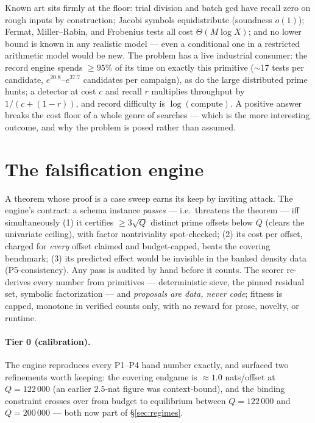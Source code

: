 Known art sits firmly at the floor: trial division and batch gcd have
recall zero on rough inputs by construction; Jacobi symbols
equidistribute (soundness $o(1)$); Fermat, Miller--Rabin, and Frobenius
tests all cost $\Theta(M\log X)$; and no lower bound is known in any
realistic model --- even a conditional one in a restricted arithmetic
model would be new. The problem has a live industrial consumer: the
record engine spends $\ge95\%$ of its time on exactly this primitive
($\sim$17 tests per candidate, $e^{20.8}$--$e^{37.7}$ candidates per
campaign), as do the large distributed prime hunts; a detector at cost
$c$ and recall $r$ multiplies throughput by $1/(c+(1-r))$, and record
difficulty is $\log(\text{compute})$. A positive answer breaks the cost
floor of a whole genre of searches --- which is the more interesting
outcome, and why the problem is posed rather than assumed.

\section{The falsification engine}\label{sec:engine7}

A theorem whose proof is a case sweep earns its keep by inviting
attack. The engine's contract: a schema instance \emph{passes} ---
i.e.\ threatens the theorem --- iff simultaneously (1) it certifies
$\ge3\sqrt Q$ distinct prime offsets below $Q$ (clears the univariate
ceiling), with factor nontriviality spot-checked; (2) its cost per
offset, charged for \emph{every} offset claimed and budget-capped,
beats the covering benchmark; (3) its predicted effect would be
invisible in the banked density data (P5-consistency). Any pass is
audited by hand before it counts. The scorer re-derives every number
from primitives --- deterministic sieve, the pinned residual set,
symbolic factorization --- and \emph{proposals are data, never code};
fitness is capped, monotone in verified counts only, with no reward for
prose, novelty, or runtime.

\paragraph{Tier 0 (calibration).} The engine reproduces every P1--P4
hand number exactly, and surfaced two refinements worth keeping: the
covering endgame is $\approx1.0$ nats/offset at $Q=122\,000$ (an
earlier $2.5$-nat figure was context-bound), and the binding constraint
crosses over from budget to equilibrium between $Q=122\,000$ and
$Q=200\,000$ --- both now part of \S\ref{sec:regimes}.

